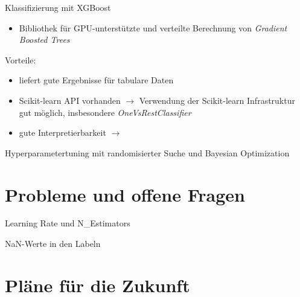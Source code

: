 \documentclass[10pt,%
	wide,%
	xcolor={x11names},%
	hyperref={colorlinks},%
	pantone312,%
	handout,%
	]{beamer}
\begin{document}
\begin{frame}[t]{Klassifizierung mit XGBoost}
	\begin{itemize}
		\item Bibliothek für GPU-unterstützte und verteilte Berechnung von \emph{Gradient Boosted Trees}
	\end{itemize}
	Vorteile:
	\begin{itemize}
		\item liefert gute Ergebnisse für tabulare Daten
		\item Scikit-learn API vorhanden $\rightarrow$ Verwendung der Scikit-learn Infrastruktur gut möglich, insbesondere \emph{OneVsRestClassifier}
		\item gute Interpretierbarkeit $\rightarrow$ 
	\end{itemize}
\end{frame}

\begin{frame}[t]{Hyperparametertuning mit randomisierter Suche und Bayesian Optimization}
	
\end{frame}

\section{Probleme und offene Fragen}

\begin{frame}[t]{Learning Rate und N\_Estimators}
	
\end{frame}

\begin{frame}[t]{NaN-Werte in den Labeln}
	
\end{frame}

\begin{frame}[t]{}
	
\end{frame}

\section{Pläne für die Zukunft}
\end{document}
